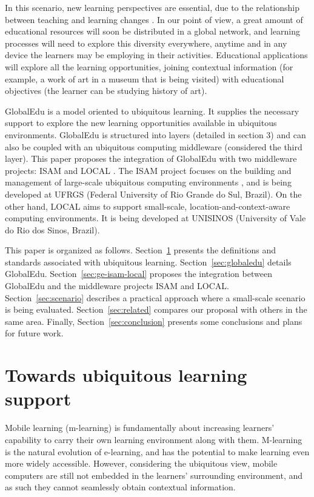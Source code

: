\documentclass[5p,authoryear]{elsarticle}
\begin{document}
In this scenario, new learning perspectives are essential, due to the
relationship between teaching and learning changes \citep{rogers05}. In our
point of view, a great amount of educational resources will soon be distributed
in a global network, and learning processes will need to explore this diversity
everywhere, anytime and in any device the learners may be employing in their
activities.  Educational applications will explore all the learning
opportunities, joining contextual information (for example, a work of art in a
museum that is being visited) with educational objectives (the learner can be
studying history of art). 

GlobalEdu is a model oriented to ubiquitous learning. It supplies the necessary
support to explore the new learning opportunities available in ubiquitous
environments. GlobalEdu is structured into layers (detailed in section 3) and
can also be coupled with an ubiquitous computing middleware (considered the
third layer). This paper proposes the integration of GlobalEdu with two
middleware projects: ISAM \citep{yamin02,augustin04} and LOCAL
\citep{barbosa07,barbosa08}. The ISAM project focuses on the building and
management of large-scale ubiquitous computing environments \citep{augustin05},
and is being developed at UFRGS (Federal University of Rio Grande do Sul,
Brazil). On the other hand, LOCAL aims to support small-scale,
location-and-context-aware computing environments. It is being developed at
UNISINOS (University of Vale do Rio dos Sinos, Brazil).

This paper is organized as follows. Section~\ref{sec:ubisupport} presents the
definitions and standards associated with ubiquitous learning.
Section~\ref{sec:globaledu} details GlobalEdu.  Section~\ref{sec:ge-isam-local}
proposes the integration between GlobalEdu and the middleware projects ISAM and
LOCAL. Section~\ref{sec:scenario} describes a practical approach where a
small-scale scenario is being evaluated. Section~\ref{sec:related} compares our
proposal with others in the same area. Finally, Section~\ref{sec:conclusion}
presents some conclusions and plans for future work.

%
%
\section{Towards ubiquitous learning support} \label{sec:ubisupport}

Mobile learning (m-learning) \citep{tatar03} is fundamentally about increasing
learners' capability to carry their own learning environment along with them.
M-learning is the natural evolution of e-learning, and has the potential to
make learning even more widely accessible. However, considering the ubiquitous
view, mobile computers are still not embedded in the learners' surrounding
environment, and as such they cannot seamlessly obtain contextual information. 
\end{document}
